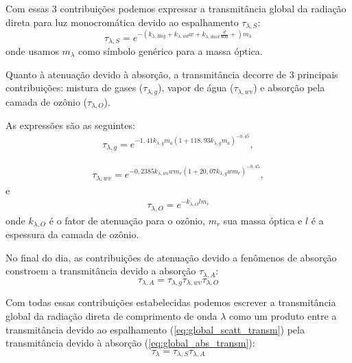 \documentclass[12pt,a4paper]{article}
\begin{document}
	Com essas 3 contribuições podemos expressar a transmitância global da
	radiação direta para luz monocromática devido ao espalhamento $\tau_{\lambda,S}$:
	\begin{equation}%
		\tau_{\lambda,S} = e^{-(k_{\lambda,Ray} + k_{\lambda,wd}w + k_{\lambda,dust}\frac{d}{800} + )m_{\lambda}}
		\label{eq:global_scatt_transm}
	\end{equation}
	onde usamos $m_\lambda$ como símbolo genérico para a massa óptica.

	Quanto à atenuação devido à absorção, a transmitância decorre de 3
	principais contribuições: mistura de gases ($\tau_{\lambda,g}$),
	vapor de água ($\tau_{\lambda,wv}$) e absorção pela camada de ozônio ($\tau_{\lambda,O}$). 

	As expressões são as seguintes:
	\begin{eqnarray}%
		\tau_{\lambda,g} = e^{-1,41 k_{\lambda,g}m_a{(1+118,93 k_{\lambda,g}m_a)}^{-0,45}}, 
		\label{eq:gas_mix_absp_transm}
	\end{eqnarray}

	\begin{eqnarray}%
		\tau_{\lambda,wv} = e^{-0,2385 k_{\lambda,wv}w m_r{(1+20,07 k_{\lambda,g}w m_r)}^{-0,45}}, 
		\label{eq:wat_v_absp_transm}
	\end{eqnarray}
	e
	\begin{eqnarray}
		\tau_{\lambda,O} = e^{-k_{\lambda,O} l m_r}
	\end{eqnarray}
	onde $k_{\lambda,O}$ é o fator de atenuação para o ozônio, $m_r$ sua
	massa óptica e $l$ é a espessura da camada de ozônio.

	No final do dia, as contribuições de atenuação devido a fenômenos de absorção constroem 
	a transmitância devido a absorção $\tau_{\lambda,A}$:
	\begin{equation}
		\tau_{\lambda,A} = \tau_{\lambda,g}\tau_{\lambda,wv}\tau_{\lambda,O} \label{eq:global_abs_transm}
	\end{equation}

	Com todas essas contribuições estabelecidas podemos escrever a transmitância global 
	da radiação direta de comprimento de onda $\lambda$ como um produto entre a transmitância devido 
	ao espalhamento (\ref{eq:global_scatt_transm}) pela transmitância devido à absorção (\ref{eq:global_abs_transm}):
	\begin{equation}
		\tau_{\lambda} = \tau_{\lambda,S}\tau_{\lambda,A}
	\end{equation}






	
	
\end{document}
